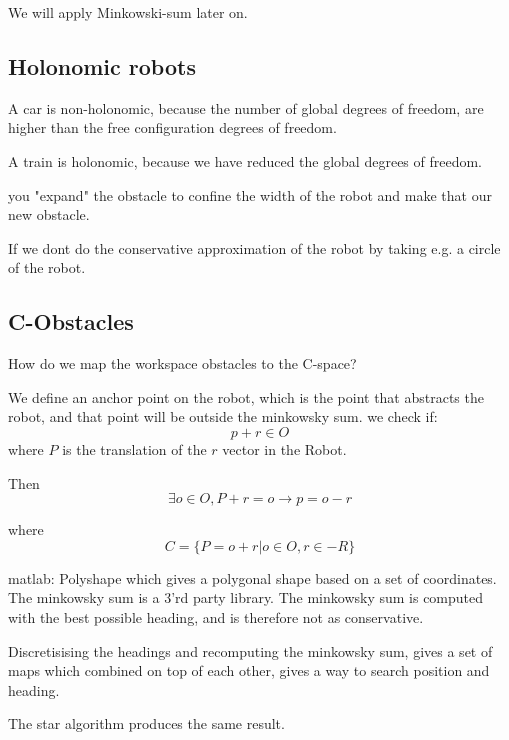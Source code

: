 \documentclass[a4paper]{article}
\begin{document}
We will apply Minkowski-sum later on.

\subsection{Holonomic robots}
A car is non-holonomic, because the number of global degrees of freedom, are higher than the free configuration degrees of freedom. 

A train is holonomic, because we have reduced the global degrees of freedom. 

you "expand" the obstacle to confine the width of the robot and make that our new obstacle. 

If we dont do the conservative approximation of the robot by taking e.g. a circle of the robot.

\subsection{C-Obstacles}
How do we map the workspace obstacles to the C-space?

We define an anchor point on the robot, which is the point that abstracts the robot, and that point will be outside the minkowsky sum.
we check if:
\begin{equation}
p + r \in O
\end{equation}
where $ P $ is the translation of the  $ r $ vector in the Robot.

Then 
\begin{equation}
\exists o \in O, P +r = o \rightarrow p = o-r
\end{equation}

where
\begin{equation}
	C = \{P = o + r | o \in O, r \in -R \}
\end{equation}

matlab: Polyshape which gives a polygonal shape based on a set of coordinates. The minkowsky sum is a 3'rd party library. The minkowsky sum is computed with the best possible heading, and is therefore not as conservative.

Discretisising the headings and recomputing the minkowsky sum, gives a set of maps which combined on top of each other, gives a way to search position and heading.

The star algorithm produces the same result.
\end{document}
